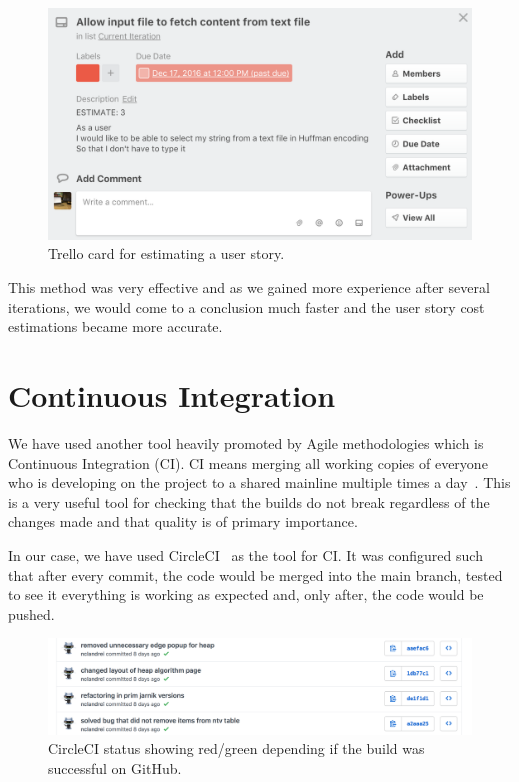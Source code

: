 \documentclass{l4proj}
\begin{document}
\begin{figure}[!ht]
\centering
\includegraphics[scale=0.5]{estimation}
\caption{Trello card for estimating a user story.}
\label{fig:estimation}
\end{figure}

This method was very effective and as we gained more experience after several iterations, we would come to a conclusion
much faster and the user story cost estimations became more accurate.

\section{Continuous Integration}

We have used another tool heavily promoted by Agile methodologies which is Continuous Integration (CI). CI means
merging all working copies of everyone who is developing on the project to a shared mainline multiple times a
day~\cite{continuous-integration}. This is a very useful tool for checking that the builds do not break regardless of the
changes made and that quality is of primary importance.

In our case, we have used CircleCI~\cite{circleci} as the tool for CI. It was configured such that after every
commit, the code would be merged into the main branch, tested to see it everything is working as expected and, only
after, the code would be pushed.

\begin{figure}[!ht]
    \centering
    \includegraphics[scale=0.5]{circleci}
    \caption{CircleCI status showing red/green depending if the build was successful on GitHub.}
    \label{fig:circleci}
\end{figure}
\end{document}
